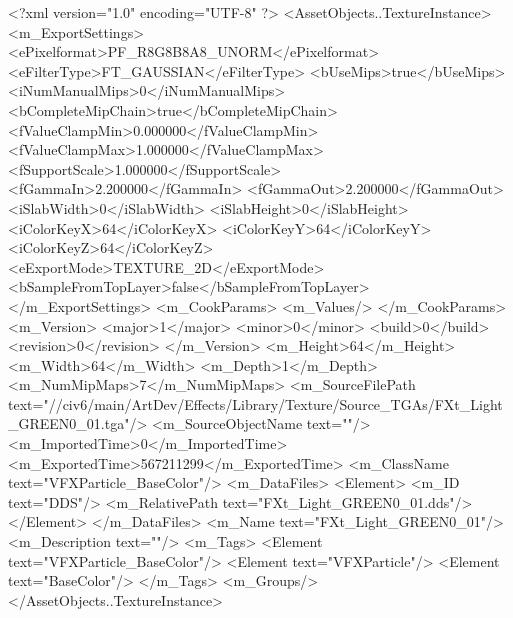 <?xml version="1.0" encoding="UTF-8" ?>
<AssetObjects..TextureInstance>
	<m_ExportSettings>
		<ePixelformat>PF_R8G8B8A8_UNORM</ePixelformat>
		<eFilterType>FT_GAUSSIAN</eFilterType>
		<bUseMips>true</bUseMips>
		<iNumManualMips>0</iNumManualMips>
		<bCompleteMipChain>true</bCompleteMipChain>
		<fValueClampMin>0.000000</fValueClampMin>
		<fValueClampMax>1.000000</fValueClampMax>
		<fSupportScale>1.000000</fSupportScale>
		<fGammaIn>2.200000</fGammaIn>
		<fGammaOut>2.200000</fGammaOut>
		<iSlabWidth>0</iSlabWidth>
		<iSlabHeight>0</iSlabHeight>
		<iColorKeyX>64</iColorKeyX>
		<iColorKeyY>64</iColorKeyY>
		<iColorKeyZ>64</iColorKeyZ>
		<eExportMode>TEXTURE_2D</eExportMode>
		<bSampleFromTopLayer>false</bSampleFromTopLayer>
	</m_ExportSettings>
	<m_CookParams>
		<m_Values/>
	</m_CookParams>
	<m_Version>
		<major>1</major>
		<minor>0</minor>
		<build>0</build>
		<revision>0</revision>
	</m_Version>
	<m_Height>64</m_Height>
	<m_Width>64</m_Width>
	<m_Depth>1</m_Depth>
	<m_NumMipMaps>7</m_NumMipMaps>
	<m_SourceFilePath text="//civ6/main/ArtDev/Effects/Library/Texture/Source_TGAs/FXt_Light_GREEN0_01.tga"/>
	<m_SourceObjectName text=""/>
	<m_ImportedTime>0</m_ImportedTime>
	<m_ExportedTime>567211299</m_ExportedTime>
	<m_ClassName text="VFXParticle_BaseColor"/>
	<m_DataFiles>
		<Element>
			<m_ID text="DDS"/>
			<m_RelativePath text="FXt_Light_GREEN0_01.dds"/>
		</Element>
	</m_DataFiles>
	<m_Name text="FXt_Light_GREEN0_01"/>
	<m_Description text=""/>
	<m_Tags>
		<Element text="VFXParticle_BaseColor"/>
		<Element text="VFXParticle"/>
		<Element text="BaseColor"/>
	</m_Tags>
	<m_Groups/>
</AssetObjects..TextureInstance>

